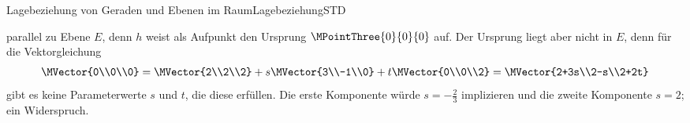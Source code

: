 \begin{MXContent}{Lagebeziehung von Geraden und Ebenen im Raum}{Lagebeziehung}{STD}
\begin{MExample}
\begin{itemize}
\[ \]
 parallel zu Ebene $E$, denn $h$ weist als Aufpunkt den Ursprung $\MPointThree{0}{0}{0}$ auf. Der Ursprung liegt aber nicht in $E$, denn für die Vektorgleichung
 \[
  \MVector{0\\0\\0}=\MVector{2\\2\\2}+s\MVector{3\\-1\\0}+t\MVector{0\\0\\2}=\MVector{2+3s\\2-s\\2+2t}
 \]
 gibt es keine Parameterwerte $s$ und $t$, die diese erfüllen. Die erste Komponente würde $s=-\frac{2}{3}$ implizieren und die zweite Komponente $s=2$; ein Widerspruch.
 

\end{itemize}
\end{MExample}
\end{MXContent}
